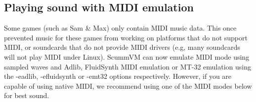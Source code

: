 \subsection{Playing sound with MIDI emulation}

Some games (such as Sam \& Max) only contain MIDI music data.  This once
prevented music for these games from working on platforms that do not support
MIDI, or soundcards that do not provide MIDI drivers (e.g, many soundcards will
not play MIDI under Linux). ScummVM can now emulate MIDI mode using sampled
waves and Adlib, FluidSynth MIDI emulation or MT-32 emulation using the
-eadlib, -efluidsynth or -emt32 options respectively.  However, if you are
capable of using native MIDI, we recommend using one of the MIDI modes below
for best sound.


